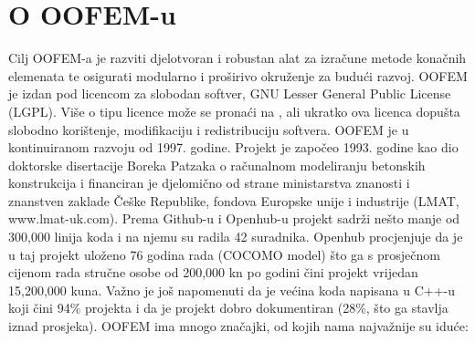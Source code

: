 \documentclass[a4paper,twoside,12pt]{memoir} %
\begin{document}
\section{O OOFEM-u}
Cilj OOFEM-a je razviti djelotvoran i robustan alat za izračune metode konačnih elemenata te osigurati modularno i proširivo okruženje za budući razvoj. OOFEM je izdan pod licencom za slobodan softver, GNU Lesser General Public License (LGPL). Više o tipu licence može se pronaći na \cite{gnu_licence}, ali ukratko ova licenca dopušta slobodno korištenje, modifikaciju i redistribuciju softvera. OOFEM je u kontinuiranom razvoju od 1997. godine. Projekt je započeo 1993. godine kao dio doktorske disertacije Boreka Patzaka o računalnom modeliranju betonskih konstrukcija i financiran je djelomično od strane ministarstva znanosti i znanstven zaklade Češke Republike, fondova Europske unije i industrije (LMAT, www.lmat-uk.com). Prema Github-u \cite{oofem_github}  i Openhub-u \cite{oofem_openhub} projekt sadrži nešto manje od 300,000 linija koda i na njemu su radila 42 suradnika. Openhub procjenjuje da je u taj projekt uloženo 76 godina rada (COCOMO model) što ga s prosječnom cijenom rada stručne osobe od 200,000 kn po godini čini projekt vrijedan 15,200,000 kuna. Važno je još napomenuti da je većina koda napisana u C++-u koji čini 94\% projekta i da je projekt dobro dokumentiran (28\%, što ga stavlja iznad prosjeka). OOFEM ima mnogo značajki, od kojih nama najvažnije su iduće:
\end{document}
